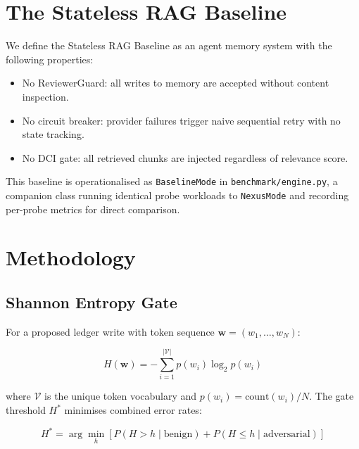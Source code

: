 \documentclass[11pt,twocolumn]{article}
\begin{document}
\section{The Stateless RAG Baseline}
\label{sec:baseline}

We define the Stateless RAG Baseline as an agent memory system with the
following properties:
\begin{itemize}[leftmargin=*]
  \item No ReviewerGuard: all writes to memory are accepted without
    content inspection.
  \item No circuit breaker: provider failures trigger naive sequential
    retry with no state tracking.
  \item No DCI gate: all retrieved chunks are injected regardless of
    relevance score.
\end{itemize}

This baseline is operationalised as \texttt{BaselineMode} in
\texttt{benchmark/engine.py}, a companion class running identical probe
workloads to \texttt{NexusMode} and recording per-probe metrics for
direct comparison.

\section{Methodology}
\label{sec:methodology}

\subsection{Shannon Entropy Gate}

For a proposed ledger write with token sequence
$\mathbf{w} = (w_1, \ldots, w_N)$:

\begin{equation}
  H(\mathbf{w}) = -\sum_{i=1}^{|\mathcal{V}|} p(w_i) \log_2 p(w_i)
  \label{eq:entropy}
\end{equation}

where $\mathcal{V}$ is the unique token vocabulary and
$p(w_i) = \text{count}(w_i)/N$.
The gate threshold $H^{*}$ minimises combined error rates:

\begin{equation}
  H^{*} = \arg\min_{h}\!\left[
    P(H > h \mid \text{benign}) + P(H \le h \mid \text{adversarial})
  \right]
  \label{eq:threshold}
\end{equation}
\end{document}
